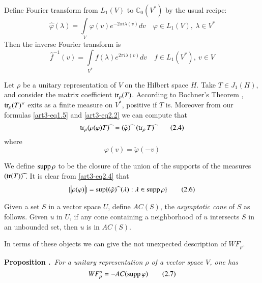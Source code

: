 Define Fourier transform from $L_{1}(V)$ to $\mathbb{C}_{0}(V^{*})$ by the usual recipe:
\begin{equation*}
\widehat{\varphi}(\lambda)=\int\limits_{V}\varphi(v)e^{-2\pi i\lambda(v)}dv\quad \varphi\in L_{1}(V), \ \lambda\in V^{*}\tag{2.2}\label{art3-eq2.2}
\end{equation*}
Then the inverse Fourier transform is
\begin{equation*}
\widehat{f}^{-1}(v)=\int\limits_{V^{*}}f(\lambda)e^{2\pi i\lambda(v)}dv\quad f\in L_{1}(V^{*}), \ v\in V\tag{2.3}\label{art3-eq2.3}
\end{equation*}

Let $\rho$ be a unitary representation of $V$ on the Hilbert space $H$. Take $T\in J_{1}(H)$, and consider the matrix coefficient $\operatorname{tr}_{\rho}(T)$. According to Bochner's Theorem \cite{art3-RS}, $\tr_{\rho}(T)\spcheck$ exits as a finite measure on $V^{*}$, positive if $T$ is. Moreover from our formulas \eqref{art3-eq1.5} and \eqref{art3-eq2.2} we can compute that
\begin{equation*}
\tr_{\rho}(\rho(\varphi)T)\sphat \  =(\check{\varphi})\sphat \ \ (\tr_{\rho}T)\sphat\tag{2.4}\label{art3-eq2.4}
\end{equation*}
where
\begin{equation*}
\varphi(v)=\check{\varphi}(-v)\tag{2.5}\label{art3-eq2.5}
\end{equation*}

We define $\operatorname{supp} \rho$ to be the closure of the union of the supports of the measures $(\tr (T))\sphat$. It is clear from \eqref{art3-eq2.4} that
\begin{equation*}
|\big| \rho(\varphi)\big||=\sup \{(\check{\varphi})\sphat \ (\lambda):\lambda \in \supp \rho\}\tag{2.6}\label{art3-eq2.6}
\end{equation*}

Given a set $S$ in a vector space $U$, define $AC(S)$, the {\em asymptotic cone} of $S$ as follows. Given $u$ in $U$, if any cone containing a neighborhood of $u$ intersects $S$ in an unbounded set, then $u$ is in $AC(S)$.

In terms of these objects we can give the not unexpected description of $WF_{\rho}$.

\medskip
\noindent
{\bf Proposition .\label{art3-prop2.1}}~{\em For a unitary representation $\rho$ of a vector space $V$, one has}
\begin{equation*}
WF^{o}_{\rho}=-AC(\operatorname{supp} \varphi)\tag{2.7}\label{art3-eq2.7}
\end{equation*}\pageoriginale

